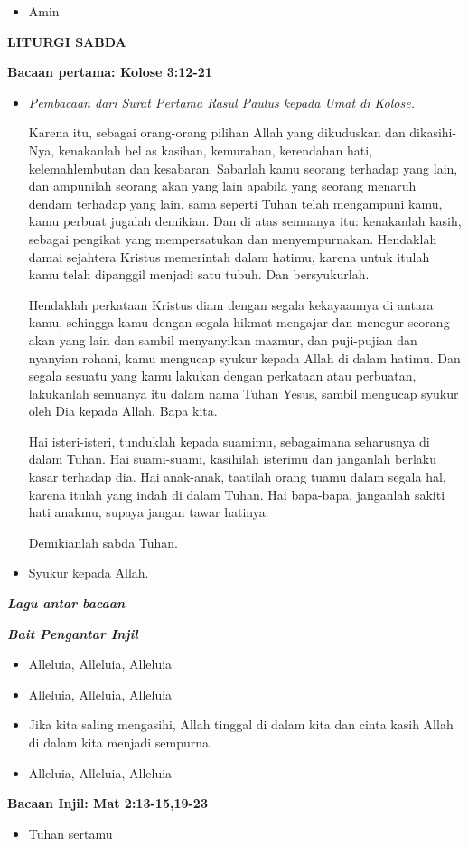 \documentclass[a5paper,headsepline,titlepage,10pt]{scrbook}
\makeatletter
\newcommand{\judul}[1]{%
  {\parindent \z@ \centering \normalfont
    \interlinepenalty\@M \Large \bfseries #1\par\nobreak \vskip 20\p@ }}
\newcommand{\subjudul}[1]{%
  {\parindent \z@ \normalfont
    \interlinepenalty\@M \bfseries #1\par\nobreak \vskip 20\p@ }}
\newcommand{\lagu}[1]{%
  {\parindent \z@ \normalfont
    \interlinepenalty\@M \bfseries \emph{#1}\par\nobreak \vskip 20\p@ }}
\newcommand{\BU}[1]{\begin{itemize} \item[U:] #1 \end{itemize}}
\newcommand{\BI}[1]{\begin{itemize} \item[I:] #1 \end{itemize}}
\newcommand{\BP}[1]{\begin{itemize} \item[P:] #1 \end{itemize}}
\makeatother
\begin{document}
\BU{Amin}

\judul{LITURGI SABDA}

\subjudul{Bacaan pertama: Kolose 3:12-21}

\BP{\emph{Pembacaan dari Surat Pertama Rasul Paulus kepada Umat di Kolose.}

Karena itu, sebagai orang-orang pilihan Allah yang dikuduskan dan dikasihi-Nya, kenakanlah bel
as kasihan, kemurahan, kerendahan hati, kelemahlembutan dan kesabaran.
Sabarlah kamu seorang terhadap yang lain, dan ampunilah seorang akan yang lain apabila yang seorang menaruh dendam terhadap yang lain, sama seperti Tuhan telah mengampuni kamu, kamu perbuat jugalah demikian.
Dan di atas semuanya itu: kenakanlah kasih, sebagai pengikat yang mempersatukan dan menyempurnakan.
Hendaklah damai sejahtera Kristus memerintah dalam hatimu, karena untuk itulah kamu telah dipanggil menjadi satu tubuh. Dan bersyukurlah.

Hendaklah perkataan Kristus diam dengan segala kekayaannya di antara kamu, sehingga kamu dengan segala hikmat mengajar dan menegur seorang akan yang lain dan sambil menyanyikan mazmur, dan puji-pujian dan nyanyian rohani, kamu mengucap syukur kepada Allah di dalam hatimu.
Dan segala sesuatu yang kamu lakukan dengan perkataan atau perbuatan, lakukanlah semuanya itu dalam nama Tuhan Yesus, sambil mengucap syukur oleh Dia kepada Allah, Bapa kita.

Hai isteri-isteri, tunduklah kepada suamimu, sebagaimana seharusnya di dalam Tuhan.
Hai suami-suami, kasihilah isterimu dan janganlah berlaku kasar terhadap dia.
Hai anak-anak, taatilah orang tuamu dalam segala hal, karena itulah yang indah di dalam Tuhan.
Hai bapa-bapa, janganlah sakiti hati anakmu, supaya jangan tawar hatinya.

Demikianlah sabda Tuhan.
}

\BU{Syukur kepada Allah.}

\lagu{Lagu antar bacaan}

\lagu{Bait Pengantar Injil}

\BI{Alleluia, Alleluia, Alleluia} 

\BU{Alleluia, Alleluia, Alleluia} 

\BI{Jika kita saling mengasihi, Allah tinggal di dalam kita dan cinta kasih Allah di dalam kita menjadi sempurna.} 
	
\BU{Alleluia, Alleluia, Alleluia} 

\subjudul{Bacaan Injil: Mat 2:13-15,19-23}

\BI{Tuhan sertamu}
\end{document}
